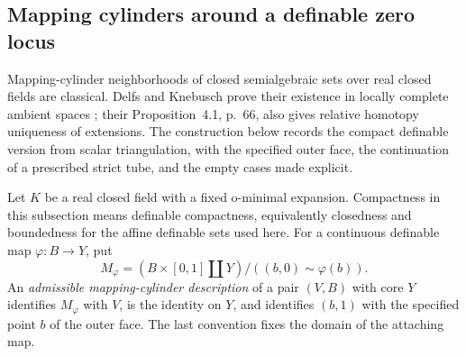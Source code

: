 \subsection{Mapping cylinders around a definable zero locus}
\label{subsec:zero-locus-mapping-cylinders}
Mapping-cylinder neighborhoods of closed semialgebraic sets over real
closed fields are classical.  Delfs and Knebusch prove their existence
in locally complete ambient spaces
\cite[Theorem~2, p.~48; \S3, pp.~63--65]{DelfsKnebusch1984Retractions};
their Proposition~4.1, p.~66, also gives relative homotopy uniqueness
of extensions.  The construction below records the compact definable
version from scalar triangulation, with the specified outer face,
the continuation of a prescribed strict tube, and the empty cases
made explicit.

Let $K$ be a real closed field with a fixed o-minimal expansion.
Compactness in this subsection means definable compactness, equivalently
closedness and boundedness for the affine definable sets used here.
For a continuous definable map $\varphi:B\to Y$, put
\[
 M_\varphi=(B\times[0,1]\amalg Y)/((b,0)\sim\varphi(b)).
\]
An \emph{admissible mapping-cylinder description} of a pair $(V,B)$
with core $Y$ identifies $M_\varphi$ with $V$, is the identity on $Y$,
and identifies $(b,1)$ with the specified point $b$ of the outer face.
The last convention fixes the domain of the attaching map.

